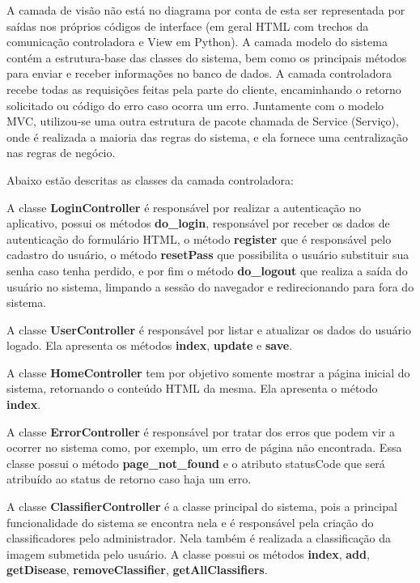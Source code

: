 \documentclass[openright]{ifrs} %
\begin{document}
A camada de visão não está no diagrama por conta de esta ser representada por saídas
nos próprios códigos de interface (em geral HTML com trechos da comunicação controladora
e View em Python). A camada modelo do sistema contém a estrutura-base das classes do sistema, bem como os principais métodos para enviar e receber informações no banco de dados. A camada controladora recebe todas as requisições feitas pela parte do cliente, encaminhando o retorno solicitado ou código do erro caso ocorra um erro. Juntamente com o modelo MVC, utilizou-se uma outra estrutura de pacote chamada de Service (Serviço), onde é realizada a maioria das regras do sistema, e ela fornece uma centralização nas regras de negócio.

Abaixo estão descritas as classes da camada controladora: 


A classe \textbf{LoginController} é responsável por realizar a autenticação no aplicativo, possui  os métodos  \textbf{do\_login}, responsável por receber os dados de autenticação do formulário HTML, o método \textbf{register} que é responsável pelo cadastro do usuário, o método \textbf{resetPass} que possibilita o usuário substituir sua senha caso tenha perdido, e por fim o método \textbf{do\_logout} que realiza a saída do usuário no sistema, limpando a sessão do navegador e redirecionando para fora do sistema.  


A classe \textbf{UserController} é responsável por listar e atualizar os dados do usuário logado. Ela apresenta os métodos \textbf{index}, \textbf{update} e \textbf{save}.



A classe \textbf{HomeController} tem por objetivo somente mostrar a página inicial do sistema, retornando o conteúdo HTML da mesma. Ela apresenta o método \textbf{index}. 


A classe \textbf{ErrorController} é responsável por tratar dos erros que podem vir a ocorrer no sistema como, por exemplo, um erro de página não encontrada. Essa classe possui o método \textbf{page\_not\_found} e o atributo statusCode que será atribuído ao status de retorno caso haja um erro.



A classe \textbf{ClassifierController} é a classe principal do sistema, pois a principal funcionalidade do sistema se encontra nela e é responsável pela criação do classificadores pelo administrador. Nela também é realizada a classificação da imagem submetida pelo usuário. A classe possui os métodos  \textbf{index}, \textbf{add}, \textbf{getDisease}, \textbf{removeClassifier}, \textbf{getAllClassifiers}.
\end{document}
